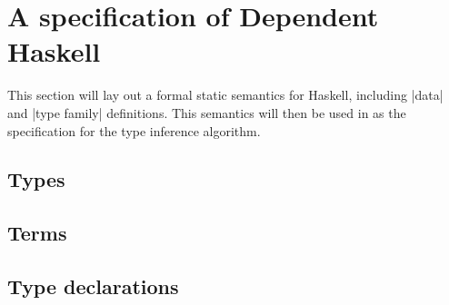 \chapter{A specification of Dependent Haskell}
\label{cha:haskell-spec}


\begin{proposal}
This section will lay out a formal static semantics for Haskell, including
|data| and |type family| definitions. This semantics will then be used in
 as the specification for the type inference algorithm.
\end{proposal}

\section{Types}

\section{Terms}

\section{Type declarations}
